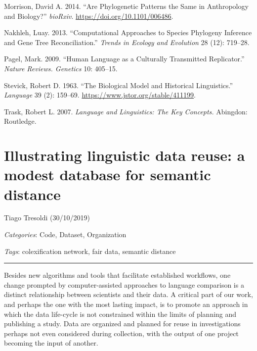 \documentclass[
  a4paper,
  14pt,
  oneside,
  tablecaptionabove
]{scrbook}
\begin{document}
\nopagebreak\hangindent=0.7cm {\small  Morrison, David A. 2014. \enquote{Are Phylogenetic Patterns the Same
in Anthropology and Biology?} \emph{bioRxiv}.
\url{https://doi.org/10.1101/006486}. }

\nopagebreak\hangindent=0.7cm {\small  Nakhleh, Luay. 2013. \enquote{Computational Approaches to Species
Phylogeny Inference and Gene Tree Reconciliation.} \emph{Trends in
Ecology and Evolution} 28 (12): 719--28. }

\nopagebreak\hangindent=0.7cm {\small  Pagel, Mark. 2009. \enquote{Human Language as a Culturally
Transmitted Replicator.} \emph{Nature Reviews. Genetics} 10: 405--15.}

\nopagebreak\hangindent=0.7cm {\small  Stevick, Robert D. 1963. \enquote{The Biological Model and
Historical Linguistics.} \emph{Language} 39 (2): 159--69.
\url{https://www.jstor.org/stable/411199}.}

\nopagebreak\hangindent=0.7cm {\small  Trask, Robert L. 2007. \emph{Language and Linguistics: The Key
Concepts.} Abingdon: Routledge.}





\newpage
\section*{Illustrating linguistic data reuse: a modest database for
semantic distance}

Tiago Tresoldi (30/10/2019)

\emph{Categories}: Code, Dataset, Organization

\emph{Tags}: colexification network, fair data, semantic distance

\begin{center}\rule{0.5\linewidth}{1pt}\end{center}

Besides new algorithms and tools that facilitate established workflows,
one change prompted by computer-assisted approaches to language
comparison is a distinct relationship between scientists and their data.
A critical part of our work, and perhaps the one with the most lasting
impact, is to promote an approach in which the data life-cycle is not
constrained within the limits of planning and publishing a study. Data
are organized and planned for reuse in investigations perhaps not even
considered during collection, with the output of one project becoming
the input of another.
\end{document}
